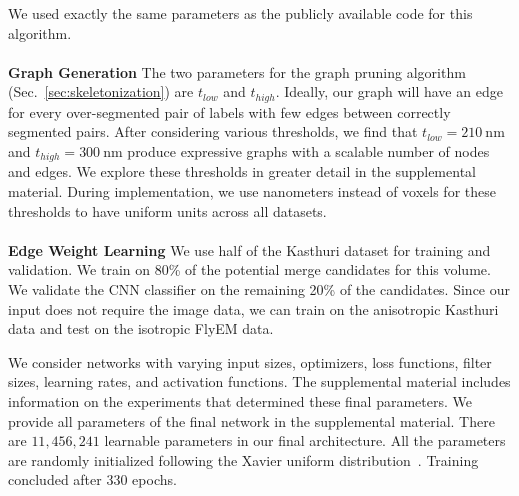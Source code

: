 We used exactly the same parameters as the publicly available code for this algorithm.
\\~\\
\noindent\textbf{Graph Generation}
The two parameters for the graph pruning algorithm (Sec.~\ref{sec:skeletonization}) are $t_{low}$ and $t_{high}$. 
Ideally, our graph will have an edge for every over-segmented pair of labels with few edges between correctly segmented pairs. 
After considering various thresholds, we find that $t_{low} = \SI{210}{\nano\meter}$ and $t_{high} = \SI{300}{\nano\meter}$ produce expressive graphs with a scalable number of nodes and edges.
We explore these thresholds in greater detail in the supplemental material.
During implementation, we use nanometers instead of voxels for these thresholds to have uniform units across all datasets.
\\~\\
\noindent\textbf{Edge Weight Learning}
\label{sec:network-parameters}
We use half of the Kasthuri dataset for training and validation. 
We train on 80\% of the potential merge candidates for this volume.
We validate the CNN classifier on the remaining 20\% of the candidates. 
Since our input does not require the image data, we can train on the anisotropic Kasthuri data and test on the isotropic FlyEM data.

We consider networks with varying input sizes, optimizers, loss functions, filter sizes, learning rates, and activation functions. 
The supplemental material includes information on the experiments that determined these final parameters. 
We provide all parameters of the final network in the supplemental material. 
There are $11,456,241$ learnable parameters in our final architecture. 
All the parameters are randomly initialized following the Xavier uniform distribution~\cite{glorot2010understanding}. 
Training concluded after 330 epochs.

